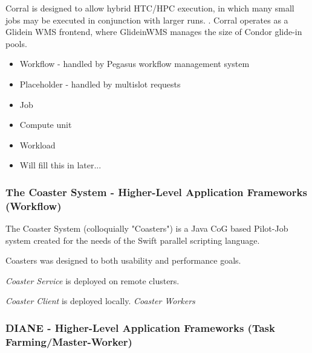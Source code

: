 \documentclass{sig-alternate}
\begin{document}
Corral is designed to allow hybrid HTC/HPC execution, in which
many small jobs may be executed in conjunction with larger runs. 
\cite{Rynge:2011:EUG:2116259.2116599}
.  Corral operates as a Glidein
WMS frontend, where GlideinWMS manages the size
of Condor glide-in pools.
\begin{itemize}
\item Workflow - handled by Pegasus workflow management system
\item Placeholder - handled by multislot requests 
\item Job
\item Compute unit
\item Workload 
\item Will fill this in later...
\end{itemize}

\subsubsection{The Coaster System - Higher-Level Application Frameworks (Workflow)}

The Coaster System (colloquially "Coasters") is a Java CoG based Pilot-Job system
created for the needs of the Swift parallel scripting language.

Coasters was designed to both usability and performance goals.


\textit{Coaster Service} is deployed on remote clusters.

\textit{Coaster Client} is deployed locally.
\textit{Coaster Workers} 




\subsubsection{DIANE - Higher-Level Application Frameworks 
  (Task Farming/Master-Worker)}

\end{document}
